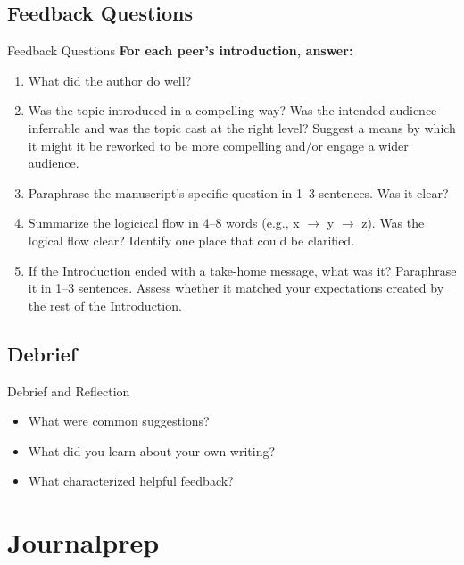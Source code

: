 \documentclass{beamer}
\begin{document}
\subsection{Feedback Questions}
\begin{frame}{Feedback Questions}
  \small
  \textbf{For each peer's introduction, answer:}
  \begin{enumerate}
    \item What did the author do well?
    \item Was the topic introduced in a compelling way?  Was the intended audience inferrable and was the topic cast at the right level?  Suggest a means by which it might it be reworked to be more compelling and/or engage a wider audience.
    \item Paraphrase the manuscript's specific question in 1--3 sentences. Was it clear?
    \item Summarize the logicical flow in 4--8 words
      (e.g., x $\rightarrow$ y $\rightarrow$ z). Was the logical flow clear? Identify one place that could be clarified.
    \item If the Introduction ended with a take-home message, what was it? Paraphrase it in 1--3 sentences.  Assess whether it matched your expectations created by the rest of the Introduction.
  \end{enumerate}

\end{frame}

\subsection{Debrief}
\begin{frame}{Debrief and Reflection}

  \begin{itemize}
    \item What were common suggestions?
    \item What did you learn about your own writing?
    \item What characterized helpful feedback?
  \end{itemize}

\end{frame}



\section{Journalprep}
\end{document}
